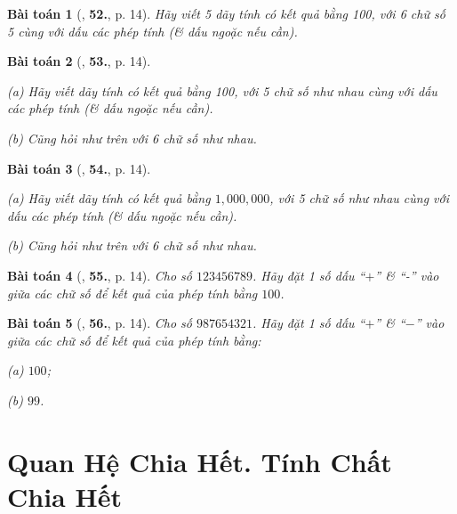 \documentclass[oneside]{book}
\numberwithin{equation}{section}
\newtheorem{baitoan}{Bài toán}[section]
\begin{document}
\begin{baitoan}[\cite{Binh_Toan_6_tap_1}, \textbf{52.}, p. 14]
	Hãy viết 5 dãy tính có kết quả bằng 100, với 6 chữ số 5 cùng với dấu các phép  tính (\& dấu ngoặc nếu cần).
\end{baitoan}

\begin{baitoan}[\cite{Binh_Toan_6_tap_1}, \textbf{53.}, p. 14]
	\begin{enumerate*}
		\item[(a)] Hãy viết dãy tính có kết quả bằng 100, với 5 chữ số như nhau cùng với dấu các phép tính (\& dấu ngoặc nếu cần).
		\item[(b)] Cũng hỏi như trên với 6 chữ số như nhau.
	\end{enumerate*}
\end{baitoan}

\begin{baitoan}[\cite{Binh_Toan_6_tap_1}, \textbf{54.}, p. 14]
	\begin{enumerate*}
		\item[(a)] Hãy viết dãy tính có kết quả bằng $1,000,000$, với 5 chữ số như nhau cùng với dấu các phép tính (\& dấu ngoặc nếu cần).
		\item[(b)] Cũng hỏi như trên với 6 chữ số như nhau.
	\end{enumerate*}
\end{baitoan}

\begin{baitoan}[\cite{Binh_Toan_6_tap_1}, \textbf{55.}, p. 14]
	 Cho số $123456789$. Hãy đặt 1 số dấu ``$+$'' \& ``-'' vào giữa các chữ số để kết quả của phép tính bằng $100$.
\end{baitoan}

\begin{baitoan}[\cite{Binh_Toan_6_tap_1}, \textbf{56.}, p. 14]
	Cho số $987654321$. Hãy đặt 1 số dấu ``$+$'' \& ``$-$'' vào giữa các chữ số để kết quả của phép tính bằng:
	\begin{enumerate*}
		\item[(a)] $100$;
		\item[(b)] $99$.
	\end{enumerate*}
\end{baitoan}


\section{Quan Hệ Chia Hết. Tính Chất Chia Hết}
\end{document}
